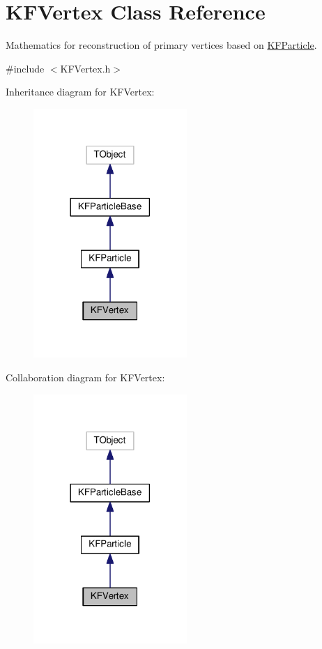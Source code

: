 \hypertarget{classKFVertex}{}\section{K\+F\+Vertex Class Reference}
\label{classKFVertex}


Mathematics for reconstruction of primary vertices based on \hyperlink{classKFParticle}{K\+F\+Particle}.  




{\ttfamily \#include $<$K\+F\+Vertex.\+h$>$}



Inheritance diagram for K\+F\+Vertex\+:\nopagebreak
\begin{figure}[H]
\begin{center}
\leavevmode
\includegraphics[width=165pt]{classKFVertex__inherit__graph}
\end{center}
\end{figure}


Collaboration diagram for K\+F\+Vertex\+:\nopagebreak
\begin{figure}[H]
\begin{center}
\leavevmode
\includegraphics[width=165pt]{classKFVertex__coll__graph}
\end{center}
\end{figure}
